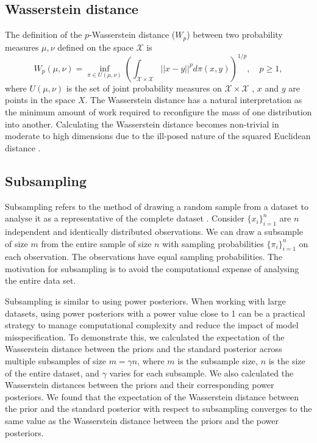 \documentclass[12pt]{article}
\begin{document}
\subsection{Wasserstein distance}
The definition of the $p$-Wasserstein distance ($W_p$) between two probability
measures $\mu, \nu$ defined on the space $\mathcal{X}$  is 
\begin{equation}
W_p(\mu, \nu) = \inf_{\pi \in U(\mu, \nu)} \left(\int_{\mathcal{X} \times \mathcal{X}}||x-y||^pd\pi(x, y) \right)^{1/p}, \quad p\geq 1,
\label{wasser:ana1}
\end{equation}
where $U(\mu, \nu)$ is the set of joint probability measures on
$\mathcal{X}\times \mathcal{X}$ \citep{villaniOptimalTransportOld2009}, $x$ and $y$ are points in the space $X$. The
Wasserstein distance has a natural interpretation as the minimum amount of work
required to reconfigure the mass of one distribution into another. Calculating
the Wasserstein distance becomes non-trivial in moderate to high dimensions due
to the ill-posed nature of the squared Euclidean distance
\citep{cuturiMongeBregmanOccam2023}. 

\subsection{Subsampling}
Subsampling refers to the method of drawing a random sample from a dataset to analyse it as a representative of the complete dataset \citep{Drineas_2006, yaoReviewOptimalSubsampling2021, Ma_2014}. Consider $\{x_i\}_{i=1}^n$ are $n$ independent and identically distributed observations. We can draw a subsample of size $m$ from the entire sample of size $n$ with sampling probabilities $\{\pi_i\}_{i=1}^n$ on each observation. The observations have equal sampling probabilities. The motivation for subsampling is to avoid the computational expense of analysing the entire data set. 

Subsampling is similar to using power posteriors. When working with large datasets, using power posteriors with a power value close to 1 can be a practical strategy to manage computational complexity and reduce the impact of model misspecification. To demonstrate this, we calculated the expectation of the Wasserstein distance between the priors and the standard posterior across multiple subsamples of size $m= \gamma n$, where $m$ is the subsample size, $n$ is the size of the entire dataset, and $\gamma$ varies for each subsample. We also calculated the Wasserstein distances between the priors and their corresponding power posteriors. We found that the expectation of the Wasserstein distance between the prior and the standard posterior with respect to subsampling converges to the same value as the Wasserstein distance between the priors and the power posteriors.
\end{document}
